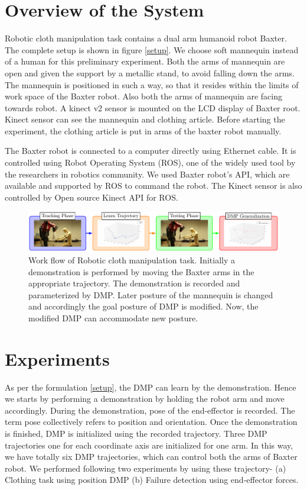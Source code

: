 \documentclass[sigconf]{acmart}
\begin{document}
\section{Overview of the System}
\label{system_overview}
Robotic cloth manipulation task contains a dual arm humanoid robot Baxter. The complete setup is shown in figure \ref{setup}. We choose soft mannequin instead of a human for this preliminary experiment. Both the arms of mannequin are open and  given the support by a metallic stand, to avoid falling down the arms. The mannequin is positioned in such a way, so that it resides within the limits of work space of the Baxter robot. Also both the arms of mannequin are facing towards robot. A kinect v2 sensor is mounted on the LCD display of Baxter root. Kinect sensor can see the mannequin and clothing article. Before starting the experiment, the clothing article is put in arms of the baxter robot manually.

The Baxter robot is connected to a computer directly using Ethernet cable. It is controlled using Robot Operating System (ROS), one of the widely used tool by the researchers in robotics community. We used Baxter robot's API, which are available and supported by ROS to command the robot. The Kinect sensor is also controlled by Open source Kinect API for ROS.

\begin{figure}
	\includegraphics[width=\textwidth]{flowchart_conf}
	\caption{Work flow of Robotic cloth manipulation task. Initially a demonstration is performed by moving the Baxter arms in the appropriate trajectory. The demonstration is recorded and parameterized by DMP. Later posture of the mannequin is changed and accordingly the goal posture of DMP is modified. Now, the modified DMP can accommodate new posture.}
	\label{workflow}
\end{figure}

\section{Experiments}
\label{experiments}
As per the formulation \ref{setup}, the DMP can learn by the demonstration. Hence we starts by performing a demonstration by holding the robot arm and move accordingly. During the demonstration, pose of the end-effector is recorded. The term pose collectively refers to position and orientation. Once the demonstration is finished, DMP is initialized using the recorded trajectory. Three DMP trajectories one for each coordinate axis are initialized for one arm. In this way, we have totally six DMP trajectories, which can control both the arms of Baxter robot. We performed following two experiments by using these trajectory- (a) Clothing task using position DMP (b) Failure detection using end-effector forces.
\end{document}

